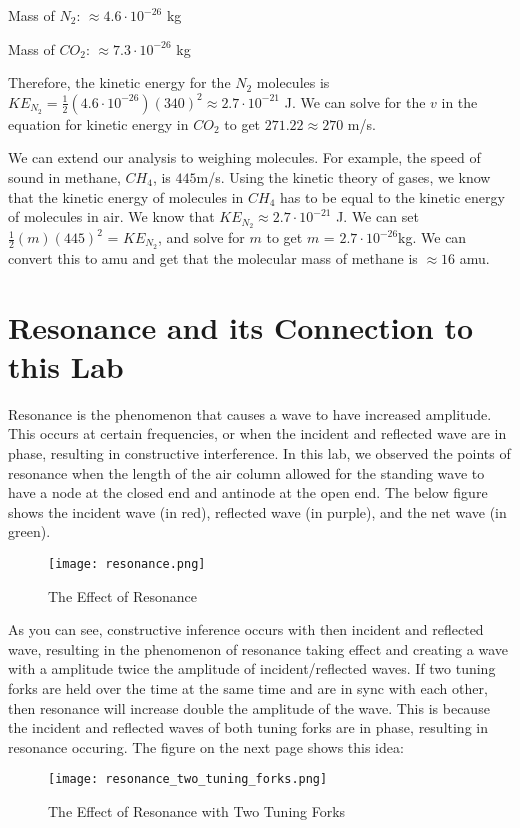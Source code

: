 \documentclass[11pt,twoside]{article}
\begin{document}
Mass of $N_2$: $\approx 4.6 \cdot 10^{-26}$ kg

Mass of $CO_2$: $\approx 7.3 \cdot 10^{-26}$ kg 

Therefore, the kinetic energy for the $N_2$ molecules is $KE_{N_2} = \frac{1}{2}(4.6 \cdot 10^{-26})(340)^2 \approx 2.7 \cdot 10^{-21}$ J. We can solve for the $v$ in the equation for kinetic energy in $CO_2$ to get $271.22 \approx 270$ m/s.

We can extend our analysis to weighing molecules. For example, the speed of sound in methane, $CH_4$, is $445$m/s. Using the kinetic theory of gases, we know that the kinetic energy of molecules in $CH_4$ has to be equal to the kinetic energy of molecules in air. We know that $KE_{N_2} \approx 2.7 \cdot 10^{-21}$ J. We can set $\frac{1}{2}(m)(445)^2$ = $KE_{N_2}$, and solve for $m$ to get $m$ = $2.7 \cdot 10^{-26}$kg. We can convert this to amu and get that the molecular mass of methane is $\approx 16$ amu.

\section{Resonance and its Connection to this Lab}

Resonance is the phenomenon that causes a wave to have increased amplitude. This occurs at certain frequencies, or when the incident and reflected wave are in phase, resulting in constructive interference. In this lab, we observed the points of resonance when the length of the air column allowed for the standing wave to have a node at the closed end and antinode at the open end. The below figure shows the incident wave (in red), reflected wave (in purple), and the net wave (in green).

\begin{figure}[H]
    \centering
    \texttt{[image: resonance.png]}
    \caption{The Effect of Resonance}
\end{figure}

As you can see, constructive inference occurs with then incident and reflected wave, resulting in the phenomenon of resonance taking effect and creating a wave with a amplitude twice the amplitude of incident/reflected waves. If two tuning forks are held over the time at the same time and are in sync with each other, then resonance will increase double the amplitude of the wave. This is because the incident and reflected waves of both tuning forks are in phase, resulting in resonance occuring. The figure on the next page shows this idea:

\newpage 

\begin{figure}[H]
    \centering
    \texttt{[image: resonance\_two\_tuning\_forks.png]}
    \caption{The Effect of Resonance with Two Tuning Forks}
\end{figure}
\end{document}

